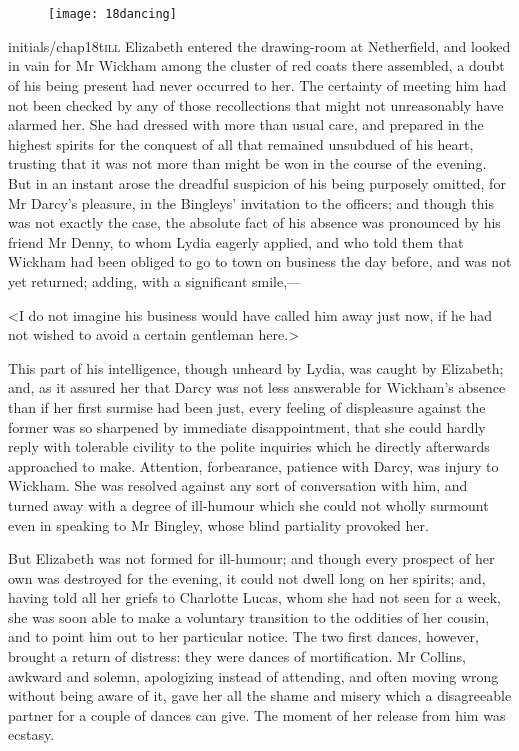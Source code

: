 \chapter[Chapter \thechapter]{}
	
\begin{figure}[t!]
\centering
\texttt{[image: 18dancing]}
\end{figure}
\lettrine[lines=6,image=true]{initials/chap18t}{ill}  Elizabeth entered the drawing-room at Netherfield, and looked in vain for Mr Wickham among the cluster of red coats there assembled, a doubt of his being present had never occurred to her. The certainty of meeting him had not been checked by any of those recollections that might not unreasonably have alarmed her. She had dressed with more than usual care, and prepared in the highest spirits for the conquest of all that remained unsubdued of his heart, trusting that it was not more than might be won in the course of the evening. But in an instant arose the dreadful suspicion of his being purposely omitted, for Mr Darcy's pleasure, in the Bingleys' invitation to the officers; and though this was not exactly the case, the absolute fact of his absence was pronounced by his friend Mr Denny, to whom Lydia eagerly applied, and who told them that Wickham had been obliged to go to town on business the day before, and was not yet returned; adding, with a significant smile,—

<I do not imagine his business would have called him away just now, if he had not wished to avoid a certain gentleman here.>

This part of his intelligence, though unheard by Lydia, was caught by Elizabeth; and, as it assured her that Darcy was not less answerable for Wickham's absence than if her first surmise had been just, every feeling of displeasure against the former was so sharpened by immediate disappointment, that she could hardly reply with tolerable civility to the polite inquiries which he directly afterwards approached to make. Attention, forbearance, patience with Darcy, was injury to Wickham. She was resolved against any sort of conversation with him, and turned away with a degree of ill-humour which she could not wholly surmount even in speaking to Mr Bingley, whose blind partiality provoked her.

But Elizabeth was not formed for ill-humour; and though every prospect of her own was destroyed for the evening, it could not dwell long on her spirits; and, having told all her griefs to Charlotte Lucas, whom she had not seen for a week, she was soon able to make a voluntary transition to the oddities of her cousin, and to point him out to her particular notice. The two first dances, however, brought a return of distress: they were dances of mortification. Mr Collins, awkward and solemn, apologizing instead of attending, and often moving wrong without being aware of it, gave her all the shame and misery which a disagreeable partner for a couple of dances can give. The moment of her release from him was ecstasy.

